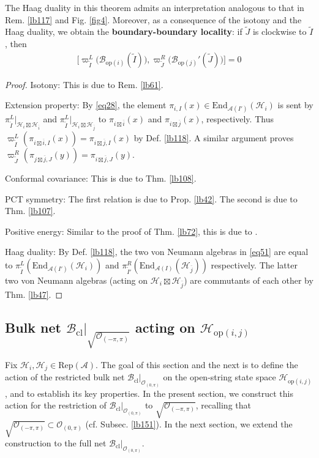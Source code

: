 \documentclass[11pt,b5paper,notitlepage]{article}
\theoremstyle{definition}
\theoremstyle{plain}
\newcommand{\wtd}{\widetilde}
\newcommand{\ovl}{\overline}
\newcommand{\End}{\mathrm{End}} %
\newcommand{\RepA}{\mathrm{Rep}(\mathcal A)}
\newcommand{\MA}{\mathcal A}
\newcommand{\MH}{\mathcal H}
\newcommand{\Bcl}{\mathcal B_{\mathrm{cl}}}
\newcommand{\Ozp}{\mathcal O_{(0,\pi)}}
\newcommand{\ZOpp}{\sqrt{\mathcal O_{(-\pi,\pi)}}}
\newcommand{\Bopi}{\mathcal B_{\mathrm{op}(i)}}
\newcommand{\Bopj}{\mathcal B_{\mathrm{op}(j)}}
\newcommand{\Hopij}{\mathcal H_{\mathrm{op}(i,j)}}
\numberwithin{equation}{section}
\begin{document}
The Haag duality in this theorem admits an interpretation analogous to that in Rem. \ref{lb117} and Fig. \ref{fig4}. Moreover, as a consequence of the isotony and the Haag duality, we obtain the \textbf{boundary-boundary locality}: if $\wtd J$ is clockwise to $\wtd I$, then
\begin{align*}
\big[\varpi^L_{\wtd I}\big(\Bopi(\wtd I)\big),\varpi^R_{\wtd J}\big(\Bopj'(\wtd J)\big)\big]=0
\end{align*}

\begin{proof}
Isotony: This is due to Rem. \ref{lb61}.

Extension property: By \eqref{eq28}, the element $\pi_{i,I}(x)\in\End_{\MA(I')}(\MH_i)$ is sent by $\pi^L_{\wtd I}|_{\MH_i\boxtimes\MH_{\ovl i}}$ and $\pi^L_{\wtd I}|_{\MH_i\boxtimes\MH_{\ovl j}}$ to $\pi_{i\boxtimes\ovl i}(x)$ and $\pi_{i\boxtimes\ovl j}(x)$, respectively. Thus $\varpi^L_{\wtd I}(\pi_{i\boxtimes\ovl i,I}(x))=\pi_{i\boxtimes\ovl j,I}(x)$ by Def. \ref{lb118}. A similar argument proves $\varpi^R_{\wtd J}(\pi_{j\boxtimes\ovl j,J}(y))=\pi_{i\boxtimes\ovl j,J}(y)$.

Conformal covariance: This is due to Thm. \ref{lb108}.

PCT symmetry: The first relation is due to Prop. \ref{lb42}. The second is due to Thm. \ref{lb107}.

Positive energy: Similar to the proof of Thm. \ref{lb72}, this is due to \cite{Wei06}.

Haag duality: By Def. \ref{lb118}, the two von Neumann algebras in \eqref{eq51} are equal to $\pi^L_{\wtd I}(\End_{\MA(I')}(\MH_i))$ and $\pi^R_{\wtd I'}(\End_{\MA(I)}(\MH_{\ovl j}))$ respectively. The latter two von Neumann algebras (acting on $\MH_i\boxtimes\MH_{\ovl j}$) are commutants of each other by Thm. \ref{lb47}.
\end{proof}





\subsection{Bulk net $\Bcl\big\vert_{\ZOpp}$ acting on $\Hopij$}

Fix $\MH_i,\MH_j\in\RepA$. The goal of this section and the next is to define the action of the restricted bulk net $\Bcl|_{\Ozp}$ on the open-string state space $\Hopij$, and to establish its key properties. In the present section, we construct this action for the restriction of $\Bcl|_{\Ozp}$ to $\ZOpp$, recalling that $\ZOpp\subset\Ozp$ (cf. Subsec. \ref{lb151}). In the next section, we extend the construction to the full net $\Bcl|_{\Ozp}$.
\end{document}
